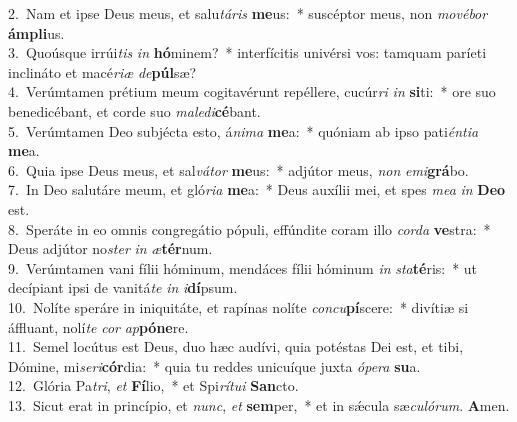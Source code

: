 {2.~}Nam et ipse Deus meus, et salu\textit{tá}\textit{ris} \textbf{me}us:~* suscéptor meus, non \textit{mo}\textit{vé}\textit{bor} \textbf{ám}\textbf{pli}us.\\
{3.~}Quoúsque irrúi\textit{tis} \textit{in} \textbf{hó}minem?~* interfícitis univérsi vos: tamquam paríeti inclináto et macé\textit{ri}\textit{æ} \textit{de}\textbf{púl}sæ?\\
{4.~}Verúmtamen prétium meum cogitavérunt repéllere, cucúr\textit{ri} \textit{in} \textbf{si}ti:~* ore suo benedicébant, et corde suo \textit{ma}\textit{le}\textit{di}\textbf{cé}bant.\\
{5.~}Verúmtamen Deo subjécta esto, á\textit{ni}\textit{ma} \textbf{me}a:~* quóniam ab ipso pati\textit{én}\textit{ti}\textit{a} \textbf{me}a.\\
{6.~}Quia ipse Deus meus, et sal\textit{vá}\textit{tor} \textbf{me}us:~* adjútor meus, \textit{non} \textit{e}\textit{mi}\textbf{grá}bo.\\
{7.~}In Deo salutáre meum, et gló\textit{ri}\textit{a} \textbf{me}a:~* Deus auxílii mei, et spes \textit{me}\textit{a} \textit{in} \textbf{De}\textbf{o} est.\\
{8.~}Speráte in eo omnis congregátio pópuli, effúndite coram illo \textit{cor}\textit{da} \textbf{ve}stra:~* Deus adjútor no\textit{ster} \textit{in} \textit{æ}\textbf{tér}num.\\
{9.~}Verúmtamen vani fílii hóminum, mendáces fílii hóminum \textit{in} \textit{sta}\textbf{té}ris:~* ut decípiant ipsi de vanitá\textit{te} \textit{in} \textit{i}\textbf{dí}psum.\\
{10.~}Nolíte speráre in iniquitáte, et rapínas nolíte \textit{con}\textit{cu}\textbf{pí}scere:~* divítiæ si áffluant, nolí\textit{te} \textit{cor} \textit{ap}\textbf{pó}\textbf{ne}re.\\
{11.~}Semel locútus est Deus, duo hæc audívi, quia potéstas Dei est, et tibi, Dómine, mi\textit{se}\textit{ri}\textbf{cór}dia:~* quia tu reddes unicuíque juxta \textit{ó}\textit{pe}\textit{ra} \textbf{su}a.\\
{12.~}Glória Pa\textit{tri}, \textit{et} \textbf{Fí}lio,~* et Spi\textit{rí}\textit{tu}\textit{i} \textbf{San}cto.\\
{13.~}Sicut erat in princípio, et \textit{nunc}, \textit{et} \textbf{sem}per,~* et in sǽcula sæ\textit{cu}\textit{ló}\textit{rum}. \textbf{A}men.\\
